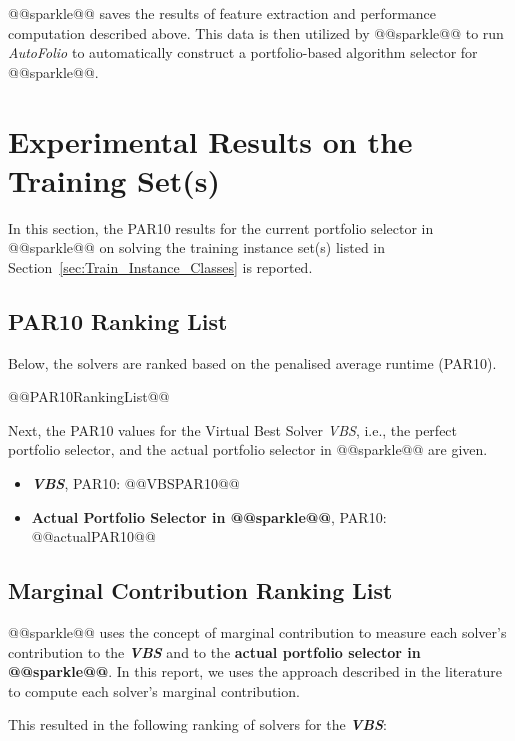 \documentclass[british]{article}
\begin{document}
@@sparkle@@ saves the results of feature extraction and performance computation described above. This data is then utilized by @@sparkle@@ to run \emph{AutoFolio} \cite{LinEtAl15} to automatically construct a portfolio-based algorithm selector for @@sparkle@@.


\section{Experimental Results on the Training Set(s)}
\label{sec:Experimental_Results}

In this section, the PAR10 results for the current portfolio selector in @@sparkle@@ on solving the training instance set(s) listed in Section~\ref{sec:Train_Instance_Classes} is reported.

\subsection{PAR10 Ranking List}
\label{sec:PAR10_Ranking}

Below, the solvers are ranked based on the penalised average runtime (PAR10).

\begin{enumerate}
@@PAR10RankingList@@
\end{enumerate}

Next, the PAR10 values for the Virtual Best Solver \emph{VBS}, i.e., the perfect portfolio selector, and the actual portfolio selector in @@sparkle@@ are given.

\begin{itemize}
\item \textbf{\emph{VBS}}, PAR10: @@VBSPAR10@@
\item \textbf{Actual Portfolio Selector in @@sparkle@@}, PAR10: @@actualPAR10@@
\end{itemize}

\subsection{Marginal Contribution Ranking List}
\label{sec:Marginal_Contribution_Ranking}

@@sparkle@@ uses the concept of marginal contribution \cite{XuEtAl12} to measure each solver's contribution to the \textbf{\emph{VBS}} and to the \textbf{actual portfolio selector in @@sparkle@@}. In this report, we uses the approach described in the literature \cite{FreEtAl16} to compute each solver's marginal contribution.

This resulted in the following ranking of solvers for the \textbf{{\em VBS}}:
\end{document}

